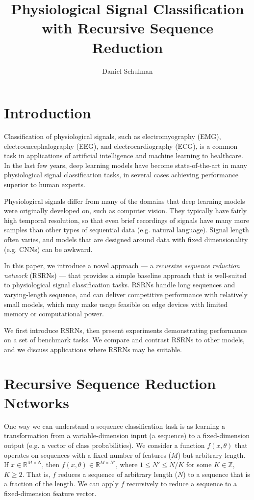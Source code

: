 \documentclass{article}
\title{Physiological Signal Classification with Recursive Sequence Reduction}
\author{Daniel Schulman}
\newcommand{\real}{\mathbb{R}}
\begin{document}
\maketitle

\section{Introduction}

Classification of physiological signals, such as electromyography (EMG), electroencephalography (EEG), and electrocardiography (ECG), is a common task in applications of artificial intelligence and machine learning to healthcare.
In the last few years, deep learning models have become state-of-the-art in many physiological signal classification tasks, in several cases achieving performance superior to human experts.

Physiological signals differ from many of the domains that deep learning models were originally developed on, such as computer vision.
They typically have fairly high temporal resolution, so that even brief recordings of signals have many more samples than other types of sequential data (e.g. natural language).
Signal length often varies, and models that are designed around data with fixed dimensionality (e.g. CNNs) can be awkward.

In this paper, we introduce a novel approach --- a \emph{recursive sequence reduction network} (RSRNs) --- that provides a simple baseline approach that is well-suited to physiological signal classification tasks.
RSRNs handle long sequences and varying-length sequence, and can deliver competitive performance with relatively small models, which may make usage feasible on edge devices with limited memory or computational power.

We first introduce RSRNs, then present experiments demonstrating performance on a set of benchmark tasks.
We compare and contrast RSRNs to other models, and we discuss applications where RSRNs may be suitable.

\section{Recursive Sequence Reduction Networks}

One way we can understand a sequence classification task is as learning a transformation from a variable-dimension input (a sequence) to a fixed-dimension output (e.g. a vector of class probabilities).
We consider a function $f(x,\theta)$ that operates on sequences with a fixed number of features ($M$) but arbitrary length.
If $x \in \real^{M \times N}$, then $f(x, \theta) \in \real^{M \times N'}$, where $1 \leq N' \leq N/K$ for some $K \in \mathbb{Z}$, $K \geq 2$.
That is, $f$ reduces a sequence of arbitrary length ($N$) to a sequence that is a fraction of the length.
We can apply $f$ recursively to reduce a sequence to a fixed-dimension feature vector.
\end{document}

